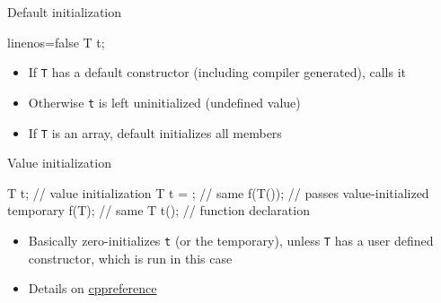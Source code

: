 \begin{frame}[fragile]
  \begin{block}{Default initialization}
    \begin{cppcode*}{linenos=false}
      T t;
    \end{cppcode*}
    \begin{itemize}
      \item If \texttt{T} has a default constructor (including compiler generated), calls it
      \item Otherwise \texttt{t} is left uninitialized (undefined value)
      \item If \texttt{T} is an array, default initializes all members
    \end{itemize}
  \end{block}
\end{frame}

\begin{frame}[fragile]
  \begin{block}{Value initialization}
    \begin{cppcode}
      T t{};    // value initialization
      T t = {}; // same
      f(T());   // passes value-initialized temporary
      f(T{});   // same
      T t();    // function declaration
    \end{cppcode}
    \begin{itemize}
      \item Basically zero-initializes \texttt{t} (or the temporary), unless \texttt{T} has a user defined constructor, which is run in this case
      \item Details on \href{https://en.cppreference.com/w/cpp/language/value_initialization}{cppreference}
    \end{itemize}
  \end{block}
\end{frame}

